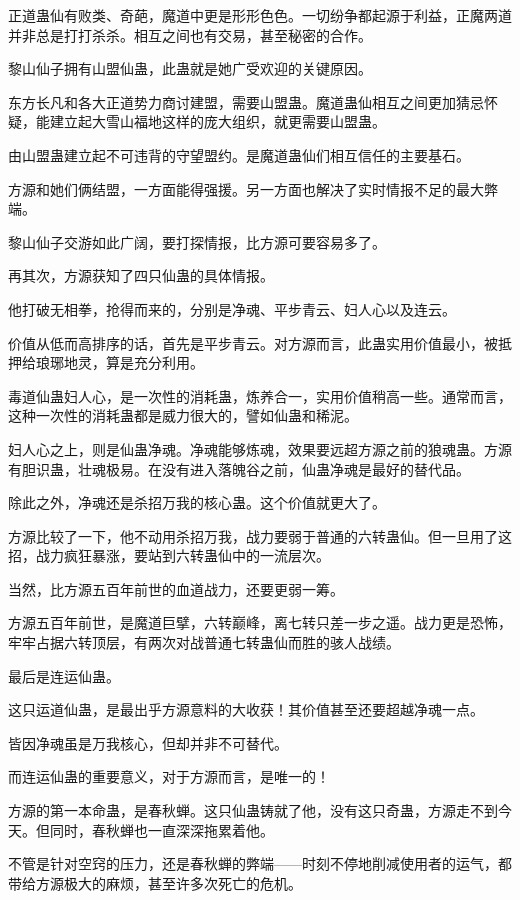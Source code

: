 \begin{this_body}
正道蛊仙有败类、奇葩，魔道中更是形形色色。一切纷争都起源于利益，正魔两道并非总是打打杀杀。相互之间也有交易，甚至秘密的合作。

黎山仙子拥有山盟仙蛊，此蛊就是她广受欢迎的关键原因。

东方长凡和各大正道势力商讨建盟，需要山盟蛊。魔道蛊仙相互之间更加猜忌怀疑，能建立起大雪山福地这样的庞大组织，就更需要山盟蛊。

由山盟蛊建立起不可违背的守望盟约。是魔道蛊仙们相互信任的主要基石。

方源和她们俩结盟，一方面能得强援。另一方面也解决了实时情报不足的最大弊端。

黎山仙子交游如此广阔，要打探情报，比方源可要容易多了。

再其次，方源获知了四只仙蛊的具体情报。

他打破无相拳，抢得而来的，分别是净魂、平步青云、妇人心以及连云。

价值从低而高排序的话，首先是平步青云。对方源而言，此蛊实用价值最小，被抵押给琅琊地灵，算是充分利用。

毒道仙蛊妇人心，是一次性的消耗蛊，炼养合一，实用价值稍高一些。通常而言，这种一次性的消耗蛊都是威力很大的，譬如仙蛊和稀泥。

妇人心之上，则是仙蛊净魂。净魂能够炼魂，效果要远超方源之前的狼魂蛊。方源有胆识蛊，壮魂极易。在没有进入落魄谷之前，仙蛊净魂是最好的替代品。

除此之外，净魂还是杀招万我的核心蛊。这个价值就更大了。

方源比较了一下，他不动用杀招万我，战力要弱于普通的六转蛊仙。但一旦用了这招，战力疯狂暴涨，要站到六转蛊仙中的一流层次。

当然，比方源五百年前世的血道战力，还要更弱一筹。

方源五百年前世，是魔道巨擘，六转巅峰，离七转只差一步之遥。战力更是恐怖，牢牢占据六转顶层，有两次对战普通七转蛊仙而胜的骇人战绩。

最后是连运仙蛊。

这只运道仙蛊，是最出乎方源意料的大收获！其价值甚至还要超越净魂一点。

皆因净魂虽是万我核心，但却并非不可替代。

而连运仙蛊的重要意义，对于方源而言，是唯一的！

方源的第一本命蛊，是春秋蝉。这只仙蛊铸就了他，没有这只奇蛊，方源走不到今天。但同时，春秋蝉也一直深深拖累着他。

不管是针对空窍的压力，还是春秋蝉的弊端——时刻不停地削减使用者的运气，都带给方源极大的麻烦，甚至许多次死亡的危机。


\end{this_body}
